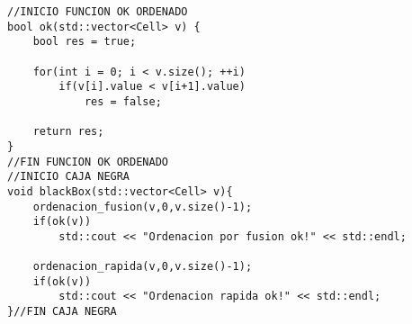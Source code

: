 \begin{lstlisting}
//INICIO FUNCION OK ORDENADO
bool ok(std::vector<Cell> v) {
    bool res = true;
    
    for(int i = 0; i < v.size(); ++i)
        if(v[i].value < v[i+1].value) 
        	res = false;
    
    return res;
}
//FIN FUNCION OK ORDENADO
//INICIO CAJA NEGRA
void blackBox(std::vector<Cell> v){
	ordenacion_fusion(v,0,v.size()-1);
	if(ok(v))
		std::cout << "Ordenacion por fusion ok!" << std::endl;
				
	ordenacion_rapida(v,0,v.size()-1);
	if(ok(v))
		std::cout << "Ordenacion rapida ok!" << std::endl;
}//FIN CAJA NEGRA
\end{lstlisting}

